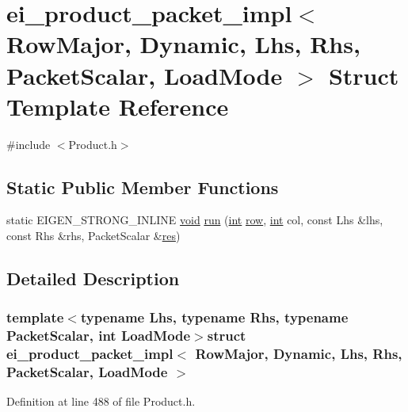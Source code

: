 \hypertarget{structei__product__packet__impl_3_01_row_major_00_01_dynamic_00_01_lhs_00_01_rhs_00_01_packet_scalar_00_01_load_mode_01_4}{\section{ei\-\_\-product\-\_\-packet\-\_\-impl$<$ Row\-Major, Dynamic, Lhs, Rhs, Packet\-Scalar, Load\-Mode $>$ Struct Template Reference}
\label{structei__product__packet__impl_3_01_row_major_00_01_dynamic_00_01_lhs_00_01_rhs_00_01_packet_scalar_00_01_load_mode_01_4}
}


{\ttfamily \#include $<$Product.\-h$>$}

\subsection*{Static Public Member Functions}
\begin{DoxyCompactItemize}
\item 
static E\-I\-G\-E\-N\-\_\-\-S\-T\-R\-O\-N\-G\-\_\-\-I\-N\-L\-I\-N\-E \hyperlink{group___u_a_v_objects_plugin_ga444cf2ff3f0ecbe028adce838d373f5c}{void} \hyperlink{structei__product__packet__impl_3_01_row_major_00_01_dynamic_00_01_lhs_00_01_rhs_00_01_packet_scalar_00_01_load_mode_01_4_a25b5b332cf5c6566f1b8bdbbc55e11de}{run} (\hyperlink{ioapi_8h_a787fa3cf048117ba7123753c1e74fcd6}{int} \hyperlink{glext_8h_a11b277b422822f784ee248b43eee3e1e}{row}, \hyperlink{ioapi_8h_a787fa3cf048117ba7123753c1e74fcd6}{int} col, const Lhs \&lhs, const Rhs \&rhs, Packet\-Scalar \&\hyperlink{glext_8h_a1dbb21208b9047cc8031ca9c840d3c2f}{res})
\end{DoxyCompactItemize}


\subsection{Detailed Description}
\subsubsection*{template$<$typename Lhs, typename Rhs, typename Packet\-Scalar, int Load\-Mode$>$struct ei\-\_\-product\-\_\-packet\-\_\-impl$<$ Row\-Major, Dynamic, Lhs, Rhs, Packet\-Scalar, Load\-Mode $>$}



Definition at line 488 of file Product.\-h.



